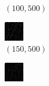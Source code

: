 \documentclass[a4paper, landscape]{article}
\begin{document}
\begin{figure}[H]
\begin{subfigure}{0.12\linewidth}
        \caption{$(100, 500)$}
    \end{subfigure}
    \begin{subfigure}{0.12\linewidth}
        \centering
        \includegraphics[width=\linewidth]{omp/k = 150, m = 500.png}
        \caption{$(150, 500)$}
    \end{subfigure}
    \begin{subfigure}{0.12\linewidth}
        \centering
        \includegraphics[width=\linewidth]{omp/k = 200, m = 500.png}

\end{subfigure}
\end{figure}
\end{document}
